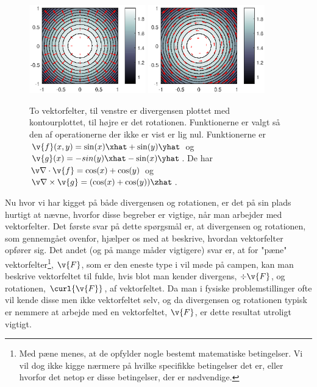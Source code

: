 \begin{figure}[h!]
\centering
\includegraphics[width = 0.45\textwidth]{matematik/fig/div.eps}
\includegraphics[width = 0.45\textwidth]{matematik/fig/rot.eps}
\caption{To vektorfelter, til venstre er divergensen plottet med kontourplottet, til højre er det rotationen. Funktionerne er valgt så den af operationerne der ikke er vist er lig nul. Funktionerne er $\v{f}(x,y) = \sin(x)\xhat+\sin(y)\yhat$ og $\v{g}(x) = -sin(y)\xhat-\sin(x)\yhat$. De har $\v \nabla \cdot \v{f} = \cos(x)+\cos(y)$ og $\v\nabla\times \v{g}=(\cos(x)+\cos(y))\zhat$.}
\end{figure}

Nu hvor vi har kigget på både divergensen og rotationen, er det på sin plads hurtigt at nævne, hvorfor disse begreber er vigtige, når man arbejder med vektorfelter. Det første svar på dette spørgsmål er, at divergensen og rotationen, som gennemgået ovenfor, hjælper os med at beskrive, hvordan vektorfelter opfører sig. Det andet (og på mange måder vigtigere) svar er, at for "pæne" vektorfelter\footnote{Med pæne menes, at de opfylder nogle bestemt matematiske betingelser. Vi vil dog ikke kigge nærmere på hvilke specifikke betingelser det er, eller hvorfor det netop er disse betingelser, der er nødvendige.}, $\v{F}$, som er den eneste type i vil møde på campen, kan man beskrive vektorfeltet til fulde, hvis blot man kender divergens, $\div{\v{F}}$, og rotationen, $\curl{\v{F}}$, af vektorfeltet. Da man i fysiske problemstillinger ofte vil kende disse men ikke vektorfeltet selv, og da divergensen og rotationen typisk er nemmere at arbejde med en vektorfeltet, $\v{F}$, er dette resultat utroligt vigtigt.


